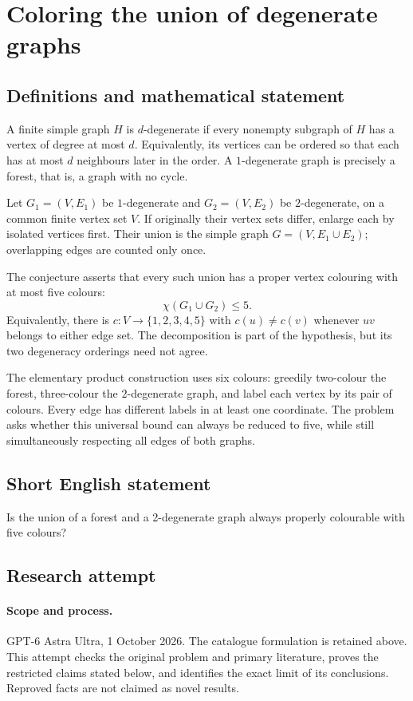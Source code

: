 \documentclass[11pt,a4paper]{article}
\begin{document}
\section*{Coloring the union of degenerate graphs}\label{statement}

\subsection{Definitions and mathematical statement}
A finite simple graph $H$ is $d$-degenerate if every
nonempty subgraph of $H$ has a vertex of degree at
most $d$. Equivalently, its vertices can be ordered
so that each has at most $d$ neighbours later in
the order. A $1$-degenerate graph is precisely a
forest, that is, a graph with no cycle.

Let $G_1=(V,E_1)$ be $1$-degenerate and
$G_2=(V,E_2)$ be $2$-degenerate, on a common finite
vertex set $V$. If originally their vertex sets
differ, enlarge each by isolated vertices first.
Their union is the simple graph
$G=(V,E_1\cup E_2)$; overlapping edges are counted
only once.

The conjecture asserts that every such union has
a proper vertex colouring with at most five colours:
\[
 \chi(G_1\cup G_2)\leq5.
\]
Equivalently, there is $c:V\to\{1,2,3,4,5\}$
with $c(u)\neq c(v)$ whenever $uv$ belongs to
either edge set. The decomposition is part of
the hypothesis, but its two degeneracy orderings
need not agree.

The elementary product construction uses six
colours: greedily two-colour the forest, three-colour
the $2$-degenerate graph, and label each vertex
by its pair of colours. Every edge has different
labels in at least one coordinate. The problem
asks whether this universal bound can always be
reduced to five, while still simultaneously
respecting all edges of both graphs.
\subsection{Short English statement}
Is the union of a forest and a 2-degenerate graph always properly colourable with five colours?
\subsection{Research attempt}
\paragraph{Scope and process.}
GPT-6 Astra Ultra, 1 October 2026. The catalogue formulation is retained above. This attempt checks the original problem and primary literature, proves the restricted claims stated below, and identifies the exact limit of its conclusions. Reproved facts are not claimed as novel results.
\end{document}
